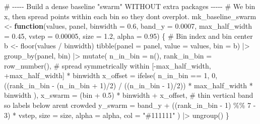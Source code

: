 \documentclass[
  letterpaper,
  DIV=11,
  numbers=noendperiod]{scrreprt}
\newenvironment{Shaded}{\begin{snugshade}}{\end{snugshade}}
\newcommand{\AttributeTok}[1]{\textcolor[rgb]{0.40,0.45,0.13}{#1}}
\newcommand{\CommentTok}[1]{\textcolor[rgb]{0.37,0.37,0.37}{#1}}
\newcommand{\ControlFlowTok}[1]{\textcolor[rgb]{0.00,0.23,0.31}{\textbf{#1}}}
\newcommand{\DecValTok}[1]{\textcolor[rgb]{0.68,0.00,0.00}{#1}}
\newcommand{\FloatTok}[1]{\textcolor[rgb]{0.68,0.00,0.00}{#1}}
\newcommand{\FunctionTok}[1]{\textcolor[rgb]{0.28,0.35,0.67}{#1}}
\newcommand{\NormalTok}[1]{\textcolor[rgb]{0.00,0.23,0.31}{#1}}
\newcommand{\OtherTok}[1]{\textcolor[rgb]{0.00,0.23,0.31}{#1}}
\newcommand{\SpecialCharTok}[1]{\textcolor[rgb]{0.37,0.37,0.37}{#1}}
\newcommand{\StringTok}[1]{\textcolor[rgb]{0.13,0.47,0.30}{#1}}
\begin{document}
\begin{Shaded}
\begin{Highlighting}[]
\CommentTok{\# {-}{-}{-}{-}{-} Build a dense baseline "swarm" WITHOUT extra packages {-}{-}{-}{-}{-}}
\CommentTok{\# We bin x, then spread points within each bin so they don\textquotesingle{}t overplot.}
\NormalTok{mk\_baseline\_swarm }\OtherTok{\textless{}{-}} \ControlFlowTok{function}\NormalTok{(values, panel, }\AttributeTok{binwidth =} \FloatTok{0.6}\NormalTok{, }\AttributeTok{band\_y =} \FloatTok{0.0007}\NormalTok{,}
                              \AttributeTok{max\_half\_width =} \FloatTok{0.45}\NormalTok{, }\AttributeTok{vstep =} \FloatTok{0.00005}\NormalTok{,}
                              \AttributeTok{size =} \FloatTok{1.2}\NormalTok{, }\AttributeTok{alpha =} \FloatTok{0.95}\NormalTok{) \{}
  \CommentTok{\# Bin index and bin center}
\NormalTok{  b }\OtherTok{\textless{}{-}} \FunctionTok{floor}\NormalTok{(values }\SpecialCharTok{/}\NormalTok{ binwidth)}
  \FunctionTok{tibble}\NormalTok{(}\AttributeTok{panel =}\NormalTok{ panel, }\AttributeTok{value =}\NormalTok{ values, }\AttributeTok{bin =}\NormalTok{ b) }\SpecialCharTok{|\textgreater{}}
    \FunctionTok{group\_by}\NormalTok{(panel, bin) }\SpecialCharTok{|\textgreater{}}
    \FunctionTok{mutate}\NormalTok{(}
      \AttributeTok{n\_in\_bin =} \FunctionTok{n}\NormalTok{(),}
      \AttributeTok{rank\_in\_bin =} \FunctionTok{row\_number}\NormalTok{(),}
      \CommentTok{\# spread symmetrically within [{-}max\_half\_width, +max\_half\_width] * binwidth}
      \AttributeTok{x\_offset =} \FunctionTok{ifelse}\NormalTok{(}
\NormalTok{        n\_in\_bin }\SpecialCharTok{==} \DecValTok{1}\NormalTok{,}
        \DecValTok{0}\NormalTok{,}
\NormalTok{        ((rank\_in\_bin }\SpecialCharTok{{-}}\NormalTok{ (n\_in\_bin }\SpecialCharTok{+} \DecValTok{1}\NormalTok{)}\SpecialCharTok{/}\DecValTok{2}\NormalTok{) }\SpecialCharTok{/}\NormalTok{ ((n\_in\_bin }\SpecialCharTok{{-}} \DecValTok{1}\NormalTok{)}\SpecialCharTok{/}\DecValTok{2}\NormalTok{)) }\SpecialCharTok{*}\NormalTok{ max\_half\_width }\SpecialCharTok{*}\NormalTok{ binwidth}
\NormalTok{      ),}
      \AttributeTok{x\_swarm =}\NormalTok{ (bin }\SpecialCharTok{+} \FloatTok{0.5}\NormalTok{) }\SpecialCharTok{*}\NormalTok{ binwidth }\SpecialCharTok{+}\NormalTok{ x\_offset,}
      \CommentTok{\# thin vertical band so labels below aren\textquotesingle{}t crowded}
      \AttributeTok{y\_swarm =}\NormalTok{ band\_y }\SpecialCharTok{+}\NormalTok{ ((rank\_in\_bin }\SpecialCharTok{{-}} \DecValTok{1}\NormalTok{) }\SpecialCharTok{\%\%} \DecValTok{7} \SpecialCharTok{{-}} \DecValTok{3}\NormalTok{) }\SpecialCharTok{*}\NormalTok{ vstep,}
      \AttributeTok{size  =}\NormalTok{ size,}
      \AttributeTok{alpha =}\NormalTok{ alpha,}
      \AttributeTok{col   =} \StringTok{"\#111111"}
\NormalTok{    ) }\SpecialCharTok{|\textgreater{}}
    \FunctionTok{ungroup}\NormalTok{()}
\NormalTok{\}}


\end{Highlighting}
\end{Shaded}
\end{document}
